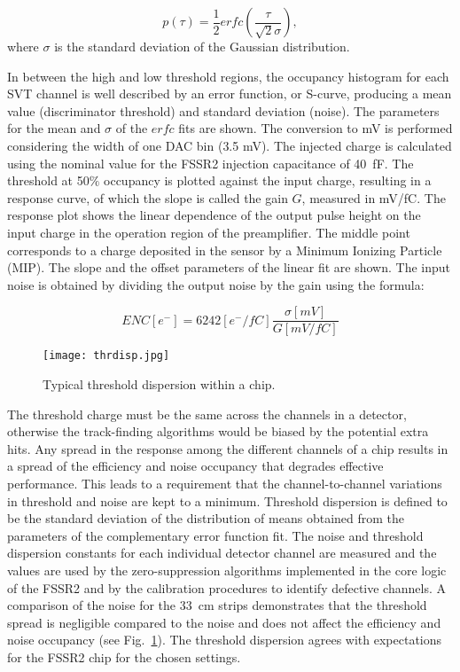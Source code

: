 \begin{equation} p(\tau)=\frac{1}{2} erfc(\frac{\tau}{\sqrt{2}\sigma})  \label{eq:erfc},
\end{equation}
where $\sigma$ is the standard deviation of the Gaussian distribution.

In between the high and low threshold regions, the occupancy histogram for each SVT channel is well described by an error function, or S-curve, producing a mean value (discriminator threshold) and standard deviation (noise). The parameters for the mean and $\sigma$ of the $erfc$ fits are shown. The conversion to mV is performed considering the width of one DAC bin (3.5 mV). The injected charge is calculated using the nominal value for the FSSR2 injection capacitance of 40~fF. The threshold at 50$\%$ occupancy is plotted against the input charge, resulting in a response curve, of which the slope is called the gain $G$, measured in mV/fC. The response plot shows the linear dependence of the output pulse height on the input charge in the operation region of the preamplifier. The middle point corresponds to a charge deposited in the sensor by a Minimum Ionizing Particle (MIP). The slope and the offset parameters of the linear fit are shown. The input noise is obtained by dividing the output noise by the gain using the formula:

\begin{equation} ENC[e^{-}]=6242[e^{-}/fC]\frac{\sigma[mV]}{G[mV/fC]}  \label{eq:enc}
\end{equation}



\begin{figure}[hbt] 
	\centering 
	\texttt{[image: thrdisp.jpg]}
	\caption{Typical threshold dispersion within a chip.}
	\label{fig:thrdisp}
\end{figure}

The threshold charge must be the same across the channels in a detector, otherwise the track-finding algorithms would be biased by the potential extra hits. Any spread in the response among the different channels of a chip results in a spread of the efficiency and noise occupancy that degrades effective performance. This leads to a requirement that the channel-to-channel variations in threshold and noise are kept to a minimum. Threshold dispersion is defined to be the standard deviation of the distribution of means obtained from the parameters of the complementary error function fit. The noise and threshold dispersion constants for each individual detector channel are measured and the values are used by the zero-suppression algorithms implemented in the core logic of the FSSR2 and by the calibration procedures to identify defective channels. A comparison of the noise for the 33~cm strips demonstrates that the threshold spread is negligible compared to the noise and does not affect the efficiency and noise occupancy (see Fig.~\ref{fig:thrdisp}). The threshold dispersion agrees with expectations for the FSSR2 chip for the chosen settings.

